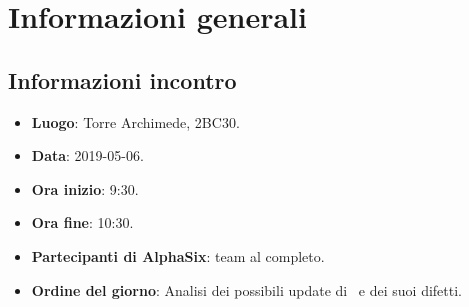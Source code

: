 \newcommand{\documento}{\VI}
\newcommand{\nomedocumentofisico}{VI\_2019-05-6.pdf}
\newcommand{\redazione}{\NC}
\newcommand{\verifica}{\SG}
\newcommand{\approvazione}{\CV}
\newcommand{\versione}{1.0.0}
\newcommand{\uso}{Interno}
\newcommand{\destinateTo}{\gruppo}
\newcommand{\datacreazione}{6 maggio 2019}
\newcommand{\datamodifica}{7 maggio 2019}
\newcommand{\stato}{Approvato}

\def\TABELLE{false}	%
\def\FIGURE{false} 	%






    

    

    \section{Informazioni generali}
		\subsection{Informazioni incontro}
			\begin{itemize}
				\item \textbf{Luogo}: Torre Archimede, 2BC30.
				\item \textbf{Data}: 2019-05-06.
				\item \textbf{Ora inizio}: 9:30.
				\item \textbf{Ora fine}: 10:30.
				\item \textbf{Partecipanti di AlphaSix}: team al completo.
				\item \textbf{Ordine del giorno}: Analisi dei possibili update di \progetto\ e dei suoi difetti.
			\end{itemize}

